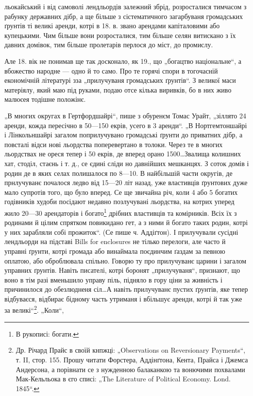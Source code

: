 льокайський і від самоволі лендльордів залежний збрід, розросталися тимчасом з рабунку державних
дібр, а ще більше з сістематичного загарбуваня громадських ґрунтів ті великі аренди, котрі в 18. в.
звано арендами капіталовими або купецькими. Чим більше вони розросталися, тим більше селян витискано
з їх давних домівок, тим більше пролетарів перлося до міст, до промислу.

Але 18. вік не понимав ще так досконало, як 19., що „богацтво національне“, а вбожество народне —
одно й то само. Про те горячі спори в тогочасній економічній літературі зза „прилучуваня громадських
ґрунтів“. З великої
маси матеріялу, який маю під руками, подаю отсе кілька виривків, бо в них живо малюєея тодішне
положінє.

„В многих округах в Гертфордшайрі“, пише з обуренєм Томас Урайт, „зіллято 24 аренди, кожда пересічно
в 50—150 екрів, усего в 3 аренди“. „В Нортгемтоншайрі і Лінкольншайрі загалом поприлучувано
громадські ґрунти до приватних дібр, а повсталі відси нові льордства поперевертано в толоки. Через
те в многих льордствах не ореся тепер і 50 екрів, де вперед орано 1500\dots Звалища колишних хат,
стоділ, стаєнь і т. д., се єдині сліди но давнійших мешканцях. З соток домів і родин де в яких селах
полишалося по 8—10. В найбільшій части округів, де прнлучуванє почалося ледво від 15—20 літ назад,
уже властивців ґрунтових дуже мало супротів того, що було вперед. Се ще звичайна річ, коли 4 або 5
богатих годівників худоби посідают недавно позлучувані льордства, на котрих уперед жило 20—30
арендаторів і богато\footnote*{
В рукописі: богати.
} дрібних властивців та комірників. Всіх їх з родинами й цілим спрятком
повикидано гет, а з ними й богато таких родин, котрі у них зарабляли собі прожиток“. (Се пише ч.
Аддіґтон). І прилучували сусідні лендльорди на підставі Bills for enclosures не тілько перелоги, але
часто й управні ґрунти, котрі громада або винаймала поєдинчим ґаздам за певною оплатою, або
оброблювала спільно. Говорю ту про прилучуванє царини
і загалом управних ґрунтів. Навіть писателі, котрі боронят „прилучуваня“, признают, що воно в тім
разі вменьшило управу піль, підняло в гору ціни за живність і причинилося до обезлюдненя сіл\dots А
навіть прилучуванє пустих ґрунтів, яке тепер відбуваєся, відбирає бідному часть утриманя
і вбільшує аренди, котрі й так уже за великі“\footnote{
Др. Річард Прайс в своїй кнпжці: „Observations on Reversionary
Payments“, т. II, стор. 155. Прошу читати Форстера, Аддінґтона, Кента,
Прайса і Джемса Андерсона, а порівнати се з нужденною балаканкою
та вонючими похвалами Мак-Кельльока в єго списі: „The Literature of
Political Economy. Lond. 1845“.
}.  „Коли“,